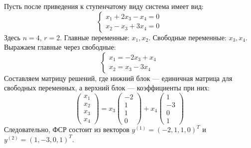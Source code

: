 \begin{example}
Пусть после приведения к ступенчатому виду система имеет вид:
\[
\begin{cases}
x_1 + 2x_3 - x_4 = 0 \\
x_2 - x_3 + 3x_4 = 0
\end{cases}
\]
Здесь $n=4$, $r=2$. Главные переменные: $x_1, x_2$. Свободные переменные: $x_3, x_4$.
Выражаем главные через свободные:
\[
\begin{cases}
x_1 = -2x_3 + x_4 \\
x_2 = x_3 - 3x_4
\end{cases}
\]
Составляем матрицу решений, где нижний блок --- единичная матрица для свободных переменных, а верхний блок --- коэффициенты при них:
\[
\begin{pmatrix} x_1 \\ x_2 \\ x_3 \\ x_4 \end{pmatrix} = 
x_3 \begin{pmatrix} -2 \\ 1 \\ 1 \\ 0 \end{pmatrix} + 
x_4 \begin{pmatrix} 1 \\ -3 \\ 0 \\ 1 \end{pmatrix}
\]
Следовательно, ФСР состоит из векторов $y^{(1)} = (-2, 1, 1, 0)^T$ и $y^{(2)} = (1, -3, 0, 1)^T$.
\end{example}
